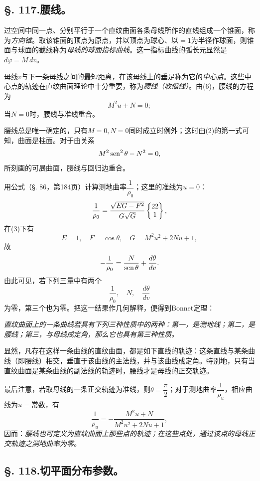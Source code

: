 \subsection*{\S. 117.\quad 腰线。}

过空间中同一点、分别平行于一个直纹曲面各条母线所作的直线组成一个锥面，称为\emph{方向锥}。取该锥面的顶点为原点，并以顶点为球心、以\(=1\)为半径作球面，则锥面与球面的截线称为\emph{母线的球面指标曲线}。这一指标曲线的弧长元显然是\(d\varphi=M\,dv\)。

母线\(v\)与下一条母线之间的最短距离，在该母线上的垂足称为它的\emph{中心点}。这些中心点的轨迹在直纹曲面理论中十分重要，称为\emph{腰线（收缩线）}。由(6)，腰线的方程为
\begin{equation}\tag{7}
 M^2u+N=0;
\end{equation}
当\(N=0\)时，腰线与准线重合。

腰线总是唯一确定的，只有\(M=0,N=0\)同时成立时例外；这时由(2)的第一式可知，曲面是柱面。对于由关系
\[
 M^2\operatorname{sen}^2\theta-N^2=0,
\]
所刻画的可展曲面，腰线与回归边重合。

用公式（\S. 86，第184页）计算测地曲率\(\dfrac1{\rho_0}\)；这里的准线为\(u=0\)：
\[
 \frac1{\rho_0}=\frac{\sqrt{EG-F^2}}{G\sqrt G}\left\{\begin{matrix}22\\1\end{matrix}\right\},
\]
在(3)下有
\[
 E=1,
 \quad F=\cos\theta,
 \quad G=M^2u^2+2Nu+1,
\]
故
\[
 -\frac1{\rho_0}=\frac{N}{\operatorname{sen}\theta}+\frac{d\theta}{dv}.
\]
由此可见，若下列三量中有两个
\[
 \frac1{\rho_0},
 \quad N,
 \quad \frac{d\theta}{dv}
\]
为零，第三个也为零。把这一结果作几何解释，便得到Bonnet定理：

\emph{直纹曲面上的一条曲线若具有下列三种性质中的两种：第一，是测地线；第二，是腰线；第三，与母线成定角，那么它也具有第三种性质。}

显然，凡存在这样一条曲线的直纹曲面，都是如下直线的轨迹：这条直线与某条曲线（即腰线）相交，垂直于该曲线的主法线，并与该曲线成定角。特别地，只有当直纹曲面是某条曲线的副法线的轨迹时，腰线才是母线的正交轨迹。

最后注意，若取母线的一条正交轨迹为准线，则\(\theta=\dfrac\pi2\)；对于测地曲率\(\dfrac1{\rho_u}\)，相应曲线为\(u=\)常数，有
\[
 \frac1{\rho_u}=-\frac{M^2u+N}{M^2u^2+2Nu+1},
\]
因而：\emph{腰线也可定义为直纹曲面上那些点的轨迹；在这些点处，通过该点的母线正交轨迹之测地曲率为零。}

\subsection*{\S. 118.\quad 切平面分布参数。}

